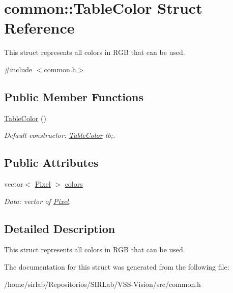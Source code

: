 \hypertarget{structcommon_1_1TableColor}{\section{common\-:\-:Table\-Color Struct Reference}
\label{structcommon_1_1TableColor}
}


This struct represents all colors in R\-G\-B that can be used.  




{\ttfamily \#include $<$common.\-h$>$}

\subsection*{Public Member Functions}
\begin{DoxyCompactItemize}
\item 
\hypertarget{structcommon_1_1TableColor_a08d8a7adc0b6462e2f78843dfd2e9b49}{\hyperlink{structcommon_1_1TableColor_a08d8a7adc0b6462e2f78843dfd2e9b49}{Table\-Color} ()}\label{structcommon_1_1TableColor_a08d8a7adc0b6462e2f78843dfd2e9b49}

\begin{DoxyCompactList}\small\item\em Default constructor\-: \hyperlink{structcommon_1_1TableColor}{Table\-Color} tb;. \end{DoxyCompactList}\end{DoxyCompactItemize}
\subsection*{Public Attributes}
\begin{DoxyCompactItemize}
\item 
\hypertarget{structcommon_1_1TableColor_a8ce253b484c9054445fcd4b3adc4726d}{vector$<$ \hyperlink{structcommon_1_1Pixel}{Pixel} $>$ \hyperlink{structcommon_1_1TableColor_a8ce253b484c9054445fcd4b3adc4726d}{colors}}\label{structcommon_1_1TableColor_a8ce253b484c9054445fcd4b3adc4726d}

\begin{DoxyCompactList}\small\item\em Data\-: vector of \hyperlink{structcommon_1_1Pixel}{Pixel}. \end{DoxyCompactList}\end{DoxyCompactItemize}


\subsection{Detailed Description}
This struct represents all colors in R\-G\-B that can be used. 

The documentation for this struct was generated from the following file\-:\begin{DoxyCompactItemize}
\item 
/home/sirlab/\-Repositorios/\-S\-I\-R\-Lab/\-V\-S\-S-\/\-Vision/src/common.\-h\end{DoxyCompactItemize}

